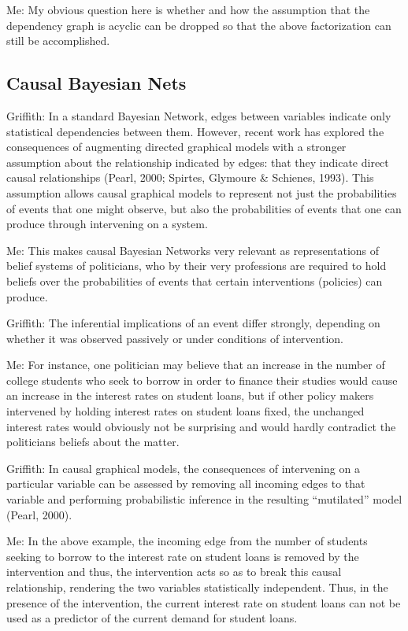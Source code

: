 \documentclass[12pt]{article}
\begin{document}
Me: 
My obvious question here is whether and how the assumption that the dependency graph is acyclic can be dropped so that the above factorization can still be accomplished. 

\subsection{Causal Bayesian Nets}
Griffith:
In a standard Bayesian Network, edges between variables indicate only statistical dependencies between them. However, recent work has explored the consequences of augmenting directed graphical models with a stronger assumption about the relationship indicated by edges: that they indicate direct causal relationships (Pearl, 2000; Spirtes, Glymoure \& Schienes, 1993). This assumption allows causal graphical models to represent not just the probabilities of events that one might observe, but also the probabilities of events that one can produce through intervening on a system. 

Me: 
This makes causal Bayesian Networks very relevant as representations of belief systems of politicians, who by their very professions are required to hold beliefs over the probabilities of events that certain interventions (policies) can produce.

Griffith:
The inferential implications of an event differ strongly, depending on whether it was observed passively or under conditions of intervention. 

Me:
For instance, one politician may believe that an increase in the number of college students who seek to borrow in order to finance their studies would cause an increase in the interest rates on student loans, but if other policy makers intervened by holding interest rates on student loans fixed, the unchanged interest rates would obviously not be surprising and would hardly contradict the politicians beliefs about the matter.

Griffith:
In causal graphical models, the consequences of intervening on a particular variable can be assessed by removing all incoming edges to that variable and performing probabilistic inference in the resulting ``mutilated'' model (Pearl, 2000).              
    
Me:
In the above example, the incoming edge from the number of students seeking to borrow to the interest rate on student loans is removed by the intervention and thus, the intervention acts so as to break this causal relationship, rendering the two variables statistically independent. Thus, in the presence of the intervention, the current interest rate on student loans can not be used as a predictor of the current demand for student loans.
\end{document}
